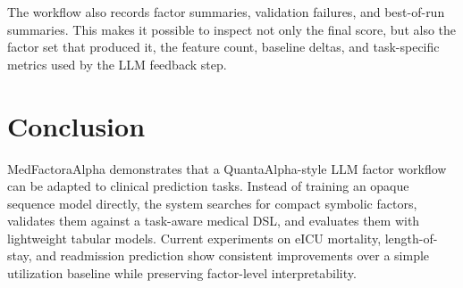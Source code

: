 \documentclass[letterpaper]{article}
\begin{document}
The workflow also records factor summaries, validation failures, and best-of-run summaries. This makes it possible to inspect not only the final score, but also the factor set that produced it, the feature count, baseline deltas, and task-specific metrics used by the LLM feedback step.

\section{Conclusion}

MedFactoraAlpha demonstrates that a QuantaAlpha-style LLM factor workflow can be adapted to clinical prediction tasks. Instead of training an opaque sequence model directly, the system searches for compact symbolic factors, validates them against a task-aware medical DSL, and evaluates them with lightweight tabular models. Current experiments on eICU mortality, length-of-stay, and readmission prediction show consistent improvements over a simple utilization baseline while preserving factor-level interpretability.
\end{document}
